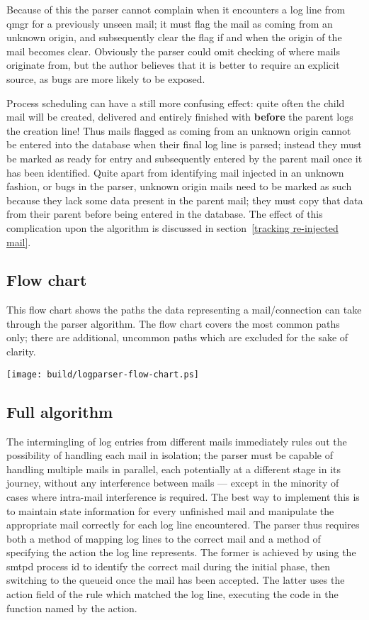 \documentclass[a4paper,12pt,draft]{article}
\begin{document}
Because of this the parser cannot complain when it encounters a log line
from qmgr for a previously unseen mail; it must flag the mail as coming
from an unknown origin, and subsequently clear the flag if and when the
origin of the mail becomes clear.  Obviously the parser could omit checking
of where mails originate from, but the author believes that it is better to
require an explicit source, as bugs are more likely to be exposed.

Process scheduling can have a still more confusing effect: quite often the
child mail will be created, delivered and entirely finished with
\textbf{before} the parent logs the creation line!  Thus mails flagged as
coming from an unknown origin cannot be entered into the database when
their final log line is parsed; instead they must be marked as ready for
entry and subsequently entered by the parent mail once it has been
identified.  Quite apart from identifying mail injected in an unknown
fashion, or bugs in the parser, unknown origin mails need to be marked as
such because they lack some data present in the parent mail; they must copy
that data from their parent before being entered in the database.  The
effect of this complication upon the algorithm is discussed in
section~\ref{tracking re-injected mail}.



\newpage
\subsection{Flow chart}

\label{flow-chart}

This flow chart shows the paths the data representing a mail/connection can
take through the parser algorithm.  The flow chart covers the most common
paths only; there are additional, uncommon paths which are excluded for the
sake of clarity.

\texttt{[image: build/logparser-flow-chart.ps]}

\subsection{Full algorithm}

\label{full-algorithm}

The intermingling of log entries from different mails immediately rules out
the possibility of handling each mail in isolation; the parser must be
capable of handling multiple mails in parallel, each potentially at a
different stage in its journey, without any interference between mails ---
except in the minority of cases where intra-mail interference is required.
The best way to implement this is to maintain state information for every
unfinished mail and manipulate the appropriate mail correctly for each log
line encountered.  The parser thus requires both a method of mapping log
lines to the correct mail and a method of specifying the action the log
line represents.  The former is achieved by using the smtpd process id to
identify the correct mail during the initial phase, then switching to the
queueid once the mail has been accepted.  The latter uses the action field
of the rule which matched the log line, executing the code in the function
named by the action.
\end{document}
